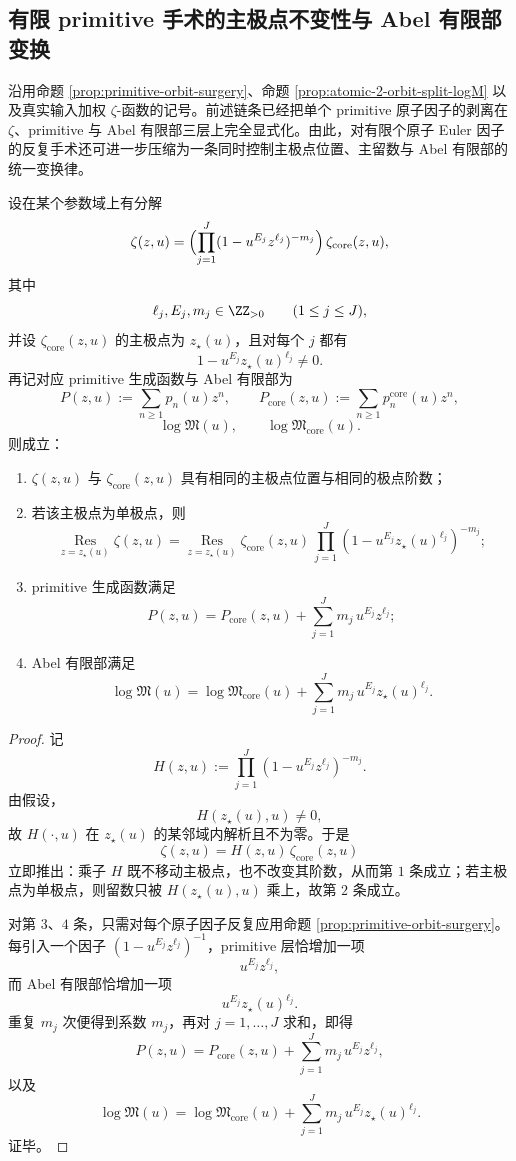 \subsection{有限 primitive 手术的主极点不变性与 Abel 有限部变换}\label{subsec:conclusion-finite-primitive-surgery-pole-abel-law}
沿用命题 \ref{prop:primitive-orbit-surgery}、命题 \ref{prop:atomic-2-orbit-split-logM} 以及真实输入加权 \(\zeta\)-函数的记号。前述链条已经把单个 primitive 原子因子的剥离在 \(\zeta\)、primitive 与 Abel 有限部三层上完全显式化。由此，对有限个原子 Euler 因子的反复手术还可进一步压缩为一条同时控制主极点位置、主留数与 Abel 有限部的统一变换律。

\begin{theorem}\label{thm:conclusion-finite-primitive-surgery-pole-finitepart-transform}
设在某个参数域上有分解
\[
\zeta(z,u)=
\Bigl(\prod_{j=1}^{J}(1-u^{E_j}z^{\ell_j})^{-m_j}\Bigr)\,
\zeta_{\mathrm{core}}(z,u),
\]
其中
\[
\ell_j,E_j,m_j\in \ZZ_{>0}\qquad (1\le j\le J),
\]
并设 \(\zeta_{\mathrm{core}}(z,u)\) 的主极点为 \(z_\star(u)\)，且对每个 \(j\) 都有
\[
1-u^{E_j}z_\star(u)^{\ell_j}\neq 0.
\]
再记对应 primitive 生成函数与 Abel 有限部为
\[
P(z,u):=\sum_{n\ge 1}p_n(u)z^n,
\qquad
P_{\mathrm{core}}(z,u):=\sum_{n\ge 1}p_n^{\mathrm{core}}(u)z^n,
\]
\[
\log\mathfrak M(u),
\qquad
\log\mathfrak M_{\mathrm{core}}(u).
\]
则成立：
\begin{enumerate}
  \item \(\zeta(z,u)\) 与 \(\zeta_{\mathrm{core}}(z,u)\) 具有相同的主极点位置与相同的极点阶数；
  \item 若该主极点为单极点，则
  \[
  \operatorname*{Res}_{z=z_\star(u)}\zeta(z,u)
  =
  \operatorname*{Res}_{z=z_\star(u)}\zeta_{\mathrm{core}}(z,u)\,
  \prod_{j=1}^{J}(1-u^{E_j}z_\star(u)^{\ell_j})^{-m_j};
  \]
  \item primitive 生成函数满足
  \[
  P(z,u)=P_{\mathrm{core}}(z,u)+\sum_{j=1}^{J}m_j\,u^{E_j}z^{\ell_j};
  \]
  \item Abel 有限部满足
  \[
  \log\mathfrak M(u)
  =
  \log\mathfrak M_{\mathrm{core}}(u)
  +
  \sum_{j=1}^{J}m_j\,u^{E_j}z_\star(u)^{\ell_j}.
  \]
\end{enumerate}
\end{theorem}
\begin{proof}
记
\[
H(z,u):=\prod_{j=1}^{J}(1-u^{E_j}z^{\ell_j})^{-m_j}.
\]
由假设，
\[
H(z_\star(u),u)\neq 0,
\]
故 \(H(\cdot,u)\) 在 \(z_\star(u)\) 的某邻域内解析且不为零。于是
\[
\zeta(z,u)=H(z,u)\,\zeta_{\mathrm{core}}(z,u)
\]
立即推出：乘子 \(H\) 既不移动主极点，也不改变其阶数，从而第 \(1\) 条成立；若主极点为单极点，则留数只被 \(H(z_\star(u),u)\) 乘上，故第 \(2\) 条成立。

对第 \(3\)、\(4\) 条，只需对每个原子因子反复应用命题 \ref{prop:primitive-orbit-surgery}。每引入一个因子 \((1-u^{E_j}z^{\ell_j})^{-1}\)，primitive 层恰增加一项
\[
u^{E_j}z^{\ell_j},
\]
而 Abel 有限部恰增加一项
\[
u^{E_j}z_\star(u)^{\ell_j}.
\]
重复 \(m_j\) 次便得到系数 \(m_j\)，再对 \(j=1,\dots,J\) 求和，即得
\[
P(z,u)=P_{\mathrm{core}}(z,u)+\sum_{j=1}^{J}m_j\,u^{E_j}z^{\ell_j},
\]
以及
\[
\log\mathfrak M(u)
=
\log\mathfrak M_{\mathrm{core}}(u)
+
\sum_{j=1}^{J}m_j\,u^{E_j}z_\star(u)^{\ell_j}.
\]
证毕。
\end{proof}


